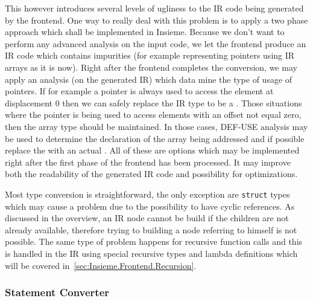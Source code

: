 This however introduces several levels of ugliness to the IR code being
generated by the frontend. One way to really deal with this problem is to apply
a two phase approach which shall be implemented in Insieme. Because we don't
want to perform any advanced analysis on the input code, we let the frontend
produce an IR code which contains impurities (for example representing pointers
using IR arrays as it is now). Right after the frontend completes the
conversion, we may apply an analysis (on the generated IR) which data mine the
type of usage of pointers. If for example a pointer is always used to access the
element at displacement 0 then we can safely replace the IR type to be a
. Those situations where the pointer is being used to
access elements with an offset not equal zero, then the array type should be
maintained. In those cases, DEF-USE  analysis may be used to
determine the declaration of the array being addressed and if possible replace
the  with an actual
. All of these are options which may be
implemented right after the first phase of the frontend has been processed. It
may improve both the readability of the generated IR code and possibility for
optimizations. 

Most type conversion is straightforward, the only exception are {\tt struct}
types which may cause a problem due to the possibility to have cyclic
references. As discussed in the overview, an IR node cannot be build if the
children are not already available, therefore trying to building a node
referring to himself is not possible. The same type of problem happens for
recursive function calls and this is handled in the IR using special recursive
types and lambda definitions which will be covered
in~\ref{sec:Insieme.Frontend.Recursion}. 

\subsubsection{Statement Converter}

